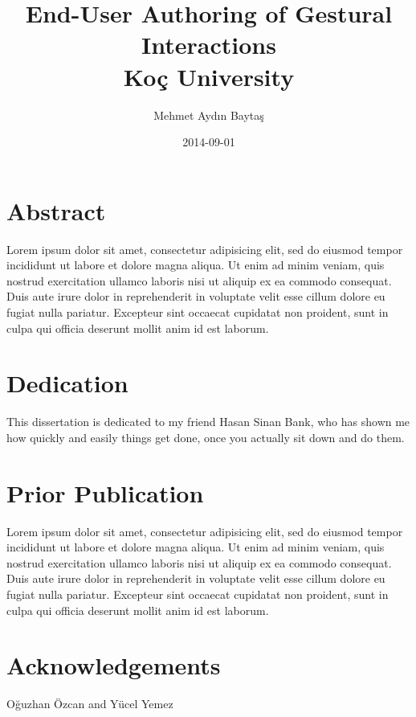 \documentclass[10pt,twoside]{book}
\begin{document}
\title{
	{End-User Authoring of Gestural Interactions}\\
	{\large Koç University}
}
\author{Mehmet Aydın Baytaş}
\date{2014-09-01}

\maketitle

\pagestyle{empty}

\chapter*{Abstract}

Lorem ipsum dolor sit amet, consectetur adipisicing elit, sed do eiusmod tempor incididunt ut labore et dolore magna aliqua. Ut enim ad minim veniam, quis nostrud exercitation ullamco laboris nisi ut aliquip ex ea commodo consequat. Duis aute irure dolor in reprehenderit in voluptate velit esse cillum dolore eu fugiat nulla pariatur. Excepteur sint occaecat cupidatat non proident, sunt in culpa qui officia deserunt mollit anim id est laborum.

\chapter*{Dedication}

This dissertation is dedicated to my friend Hasan Sinan Bank, who has shown me how quickly and easily things get done, once you actually sit down and do them.

\chapter*{Prior Publication}

Lorem ipsum dolor sit amet, consectetur adipisicing elit, sed do eiusmod tempor incididunt ut labore et dolore magna aliqua. Ut enim ad minim veniam, quis nostrud exercitation ullamco laboris nisi ut aliquip ex ea commodo consequat. Duis aute irure dolor in reprehenderit in voluptate velit esse cillum dolore eu fugiat nulla pariatur. Excepteur sint occaecat cupidatat non proident, sunt in culpa qui officia deserunt mollit anim id est laborum.

\chapter*{Acknowledgements}

Oğuzhan Özcan and Yücel Yemez
\end{document}

